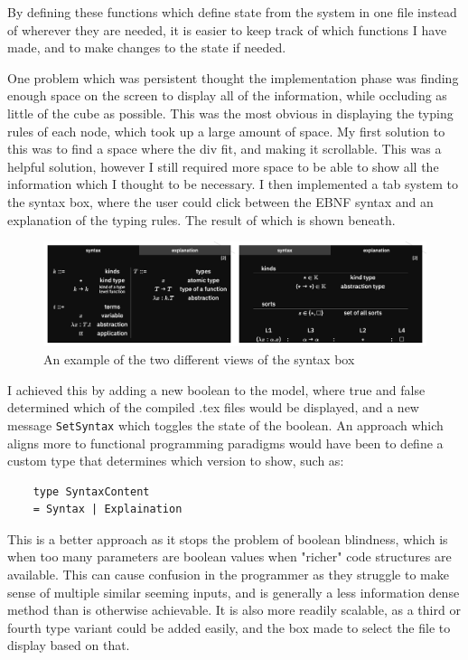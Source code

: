 \documentclass{l4proj}
\begin{document}
By defining these functions which define state from the system in one file instead of wherever they are needed, it is easier to keep track of which functions I have made, and to make changes to the state if needed.

One problem which was persistent thought the implementation phase was finding enough space on the screen to display all of the information, while occluding as little of the cube as possible.  This was the most obvious in displaying the typing rules of each node, which took up a large amount of space.  My first solution to this was to find a space where the div fit, and making it scrollable.  This was a helpful solution, however I still required more space to be able to show all the information which I thought to be necessary.  I then implemented a tab system to the syntax box, where the user could click between the EBNF syntax and an explanation of the typing rules. The result of which is shown beneath.

\begin{figure}[h!]
    \centering
    \includegraphics[width=0.8\linewidth]{dissertation/images/syntax_collage.png}
    \caption{An example of the two different views of the syntax box}
    \label{fig:enter-label}
\end{figure}

I achieved this by adding a new boolean to the model, where true and false determined which of the compiled .tex files would be displayed, and a new message \texttt{SetSyntax} which toggles the state of the boolean.  An approach which aligns more to functional programming paradigms would have been to define a custom type that determines which version to show, such as:

\begin{lstlisting}
    type SyntaxContent
    = Syntax | Explaination
\end{lstlisting}

This is a better approach as it stops the problem of boolean blindness, which is when too many parameters are boolean values when "richer" code structures are available.  This can cause confusion in the programmer as they struggle to make sense of multiple similar seeming inputs, and is generally a less information dense method than is otherwise achievable.  It is also more readily scalable, as a third or fourth type variant could be added easily, and the box made to select the file to display based on that.
\end{document}
